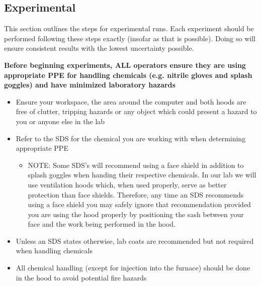 \documentclass[letterpaper,11pt]{article}
\begin{document}
    
\subsection{Experimental}
This section outlines the steps for experimental runs. Each experiment should be
performed following these steps exactly (insofar as that is possible). Doing so
will ensure consistent results with the lowest uncertainty possible.

\textbf{
Before beginning experiments, ALL operators ensure they are using
appropriate PPE for handling chemicals (e.g. nitrile gloves and splash goggles)
and have minimized laboratory hazards}

\begin{itemize}
\item Ensure your workspace, the area around the computer and 
    both hoods are free of clutter, tripping hazards or any object 
    which could present a hazard to you or anyone else in the lab
\item Refer to the SDS for the chemical you are working 
    with when determining appropriate PPE
    \begin{itemize}
    \item NOTE: Some SDS's will recommend using a face shield in 
        addition to splash goggles when handing their respective 
        chemicals. In our lab we will use ventilation hoods which, 
        when used properly, serve as better protection than face 
        shields. Therefore, any time an SDS recommends using a 
        face shield you may safely ignore that recommendation 
        provided you are using the hood properly by positioning the 
        sash between your face and the work being performed in 
        the hood.
    \end{itemize}
    
\item Unless an SDS states otherwise, lab coats are recommended but 
    not required when handling chemicals
\item All chemical handling (except for injection into the furnace) 
    should be done in the hood to avoid potential fire hazards
\end{itemize}
\end{document}
